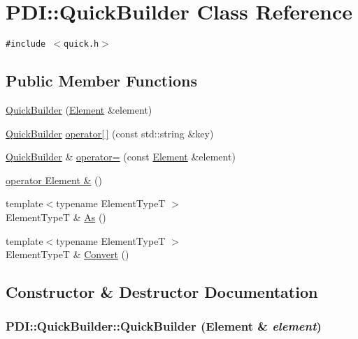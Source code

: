 \hypertarget{class_p_d_i_1_1_quick_builder}{
\section{PDI::QuickBuilder Class Reference}
\label{class_p_d_i_1_1_quick_builder}
}
{\tt \#include $<$quick.h$>$}

\subsection*{Public Member Functions}
\begin{CompactItemize}
\item 
\hyperlink{class_p_d_i_1_1_quick_builder_1e95e449c1298e85ca3b72d94fde878a}{QuickBuilder} (\hyperlink{class_p_d_i_1_1_element}{Element} \&element)
\item 
\hyperlink{class_p_d_i_1_1_quick_builder}{QuickBuilder} \hyperlink{class_p_d_i_1_1_quick_builder_fa835444ab05199dada82ca90f33151d}{operator\mbox{[}$\,$\mbox{]}} (const std::string \&key)
\item 
\hyperlink{class_p_d_i_1_1_quick_builder}{QuickBuilder} \& \hyperlink{class_p_d_i_1_1_quick_builder_a6fc28dc8c764f697e06aa48d34b32ea}{operator=} (const \hyperlink{class_p_d_i_1_1_element}{Element} \&element)
\item 
\hyperlink{class_p_d_i_1_1_quick_builder_fcf3218c14c5a4d5ac251a9e0f267d92}{operator Element \&} ()
\item 
{\footnotesize template$<$typename ElementTypeT $>$ }\\ElementTypeT \& \hyperlink{class_p_d_i_1_1_quick_builder_a67ad86ef14a3930ad09a2792a04a13c}{As} ()
\item 
{\footnotesize template$<$typename ElementTypeT $>$ }\\ElementTypeT \& \hyperlink{class_p_d_i_1_1_quick_builder_d7bc7472db091662a038487e56df4072}{Convert} ()
\end{CompactItemize}


\subsection{Constructor \& Destructor Documentation}
\hypertarget{class_p_d_i_1_1_quick_builder_1e95e449c1298e85ca3b72d94fde878a}{
\subsubsection[{QuickBuilder}]{\setlength{\rightskip}{0pt plus 5cm}PDI::QuickBuilder::QuickBuilder ({\bf Element} \& {\em element})}}
\label{class_p_d_i_1_1_quick_builder_1e95e449c1298e85ca3b72d94fde878a}




